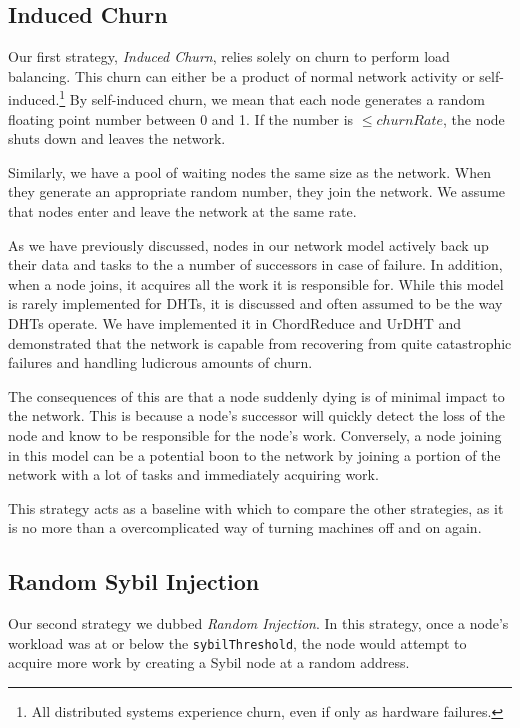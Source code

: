 \subsection{Induced Churn}
Our first strategy, \textit{Induced Churn}, relies solely on churn to perform load balancing.
This churn can either be a product of normal network activity or self-induced.\footnote{All distributed systems experience churn, even if only as hardware failures.}
By self-induced churn, we mean that each node generates a random floating point number between 0 and 1.
If the number is $\leq churnRate$, the node shuts down and leaves the network.

Similarly, we have a pool of waiting nodes the same size as the network.
When they generate an appropriate random number, they join the network.
We assume that nodes enter and leave the network at the same rate.


As we have previously discussed, nodes in our network model actively back up their data and tasks to the a number of successors in case of failure.
In addition, when a node joins, it acquires all the work it is responsible for.
While this model is rarely implemented for DHTs, it is discussed \cite{kademlia} and often assumed to be the way DHTs operate. 
We have implemented it in ChordReduce\cite{chordreduce} and UrDHT\cite{urdht} and demonstrated that the network is capable from recovering from quite catastrophic failures and handling ludicrous amounts of churn.

The consequences of this are that a node suddenly dying is of minimal impact to the network.
This is because a node's successor will quickly detect the loss of the node and know to be responsible for the node's work.
Conversely, a node joining in this model can be a potential boon to the network by joining a portion of the network with a lot of tasks and immediately acquiring work.

This strategy acts as a baseline with which to compare the other strategies, as it is no more than a overcomplicated way of turning machines off and on again. 


\subsection{Random Sybil Injection}
Our second strategy we dubbed \textit{Random Injection}.
In this strategy, once a node's workload was at or below the \texttt{sybilThreshold}, the node would attempt to acquire more work by creating a Sybil node at a random address.

